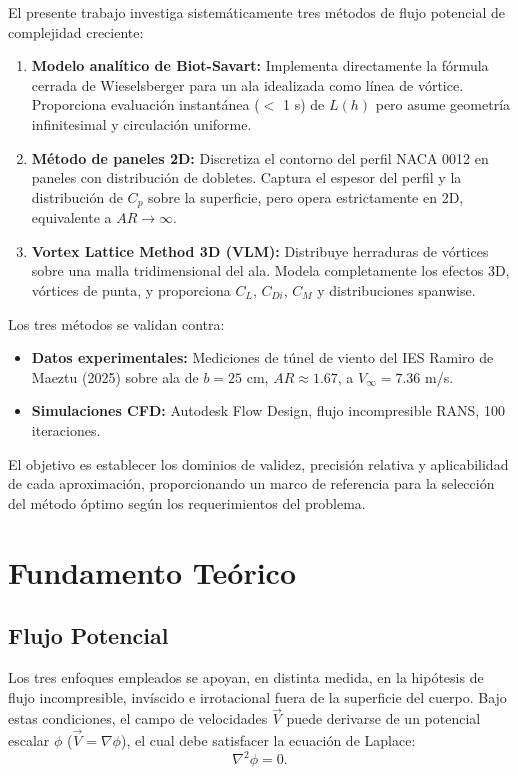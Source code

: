 \documentclass[twocolumn]{article}
\begin{document}
El presente trabajo investiga sistemáticamente tres métodos de flujo potencial de complejidad creciente:

\begin{enumerate}
    \item \textbf{Modelo analítico de Biot-Savart:} Implementa directamente la fórmula cerrada de Wieselsberger para un ala idealizada como línea de vórtice. Proporciona evaluación instantánea ($<$ 1 s) de $L(h)$ pero asume geometría infinitesimal y circulación uniforme.
    
    \item \textbf{Método de paneles 2D:} Discretiza el contorno del perfil NACA 0012 en paneles con distribución de dobletes. Captura el espesor del perfil y la distribución de $C_p$ sobre la superficie, pero opera estrictamente en 2D, equivalente a $AR \to \infty$.
    
    \item \textbf{Vortex Lattice Method 3D (VLM):} Distribuye herraduras de vórtices sobre una malla tridimensional del ala. Modela completamente los efectos 3D, vórtices de punta, y proporciona $C_L$, $C_{Di}$, $C_M$ y distribuciones spanwise.
\end{enumerate}

Los tres métodos se validan contra:

\begin{itemize}
    \item \textbf{Datos experimentales:} Mediciones de túnel de viento del IES Ramiro de Maeztu (2025) sobre ala de $b = 25$ cm, $AR \approx 1.67$, a $V_\infty = 7.36$ m/s.
    \item \textbf{Simulaciones CFD:} Autodesk Flow Design, flujo incompresible RANS, 100 iteraciones.
\end{itemize}

El objetivo es establecer los dominios de validez, precisión relativa y aplicabilidad de cada aproximación, proporcionando un marco de referencia para la selección del método óptimo según los requerimientos del problema.

\section{Fundamento Teórico}

\subsection{Flujo Potencial}
Los tres enfoques empleados se apoyan, en distinta medida, en la hipótesis de flujo incompresible, invíscido e irrotacional fuera de la superficie del cuerpo. Bajo estas condiciones, el campo de velocidades $\vec{V}$ puede derivarse de un potencial escalar $\phi$ ($\vec{V} = \nabla \phi$), el cual debe satisfacer la ecuación de Laplace:
\begin{equation}
\nabla^2 \phi = 0.
\end{equation}
\end{document}
